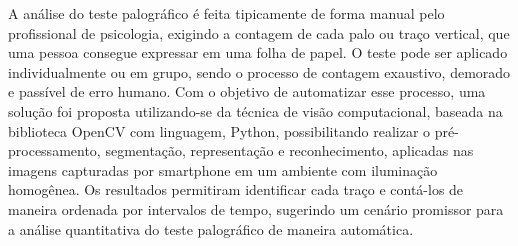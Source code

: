 
\begin{resumo} 
A análise do teste palográfico é feita tipicamente de forma manual pelo profissional de psicologia, exigindo a contagem de cada palo ou traço vertical, que uma pessoa consegue expressar em uma folha de papel. O teste pode ser aplicado individualmente ou em grupo, sendo o processo de contagem exaustivo, demorado e passível de erro humano. Com o objetivo de automatizar esse processo, uma solução foi proposta utilizando-se da técnica de visão computacional, baseada na biblioteca OpenCV com linguagem, Python, possibilitando realizar o pré-processamento, segmentação, representação e reconhecimento, aplicadas nas imagens capturadas por smartphone em um ambiente com iluminação homogênea. Os resultados permitiram identificar cada traço e contá-los de maneira ordenada por intervalos de tempo, sugerindo um cenário promissor para a análise quantitativa do teste palográfico de maneira automática.
\end{resumo}

